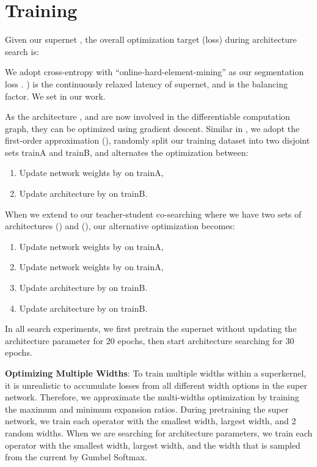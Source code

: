 \documentclass{article} \usepackage{iclr2020_conference,times}
\begin{document}
\section{Training}\vspace{-0.7em} \label{app:training}

Given our supernet , the overall optimization target (loss) during architecture search is:

We adopt cross-entropy with ``online-hard-element-mining'' as our segmentation loss . ) is the continuously relaxed latency of supernet, and  is the balancing factor. We set  in our work.

As the architecture , and  are now involved in the differentiable computation graph, they can be optimized using gradient descent. Similar in \citep{liu2019auto}, we adopt the first-order approximation (\citep{liu2018darts}), randomly split our training dataset into two disjoint sets trainA and trainB, and alternates the optimization between:
\begin{enumerate}
    \item Update network weights  by  on trainA,
    \item Update architecture  by  on trainB.
\end{enumerate}
When we extend to our teacher-student co-searching where we have two sets of architectures () and (), our alternative optimization becomes:
\begin{enumerate}
    \item Update network weights  by  on trainA,
    \item Update network weights  by  on trainA,
    \item Update architecture  by  on trainB.
    \item Update architecture  by  on trainB.
\end{enumerate}

In all search experiments, we first pretrain the supernet without updating the architecture parameter for 20 epochs, then start architecture searching for 30 epochs.


\textbf{Optimizing Multiple Widths}: To train multiple widths within a superkernel, it is unrealistic to accumulate losses from all different width options in the super network. Therefore, we approximate the multi-widths optimization by training the maximum and minimum expansion ratios. During pretraining the super network, we train each operator with the smallest width, largest width, and 2 random widths. When we are searching for architecture parameters, we train each operator with the smallest width, largest width, and the width that is sampled from the current  by Gumbel Softmax.
\end{document}
